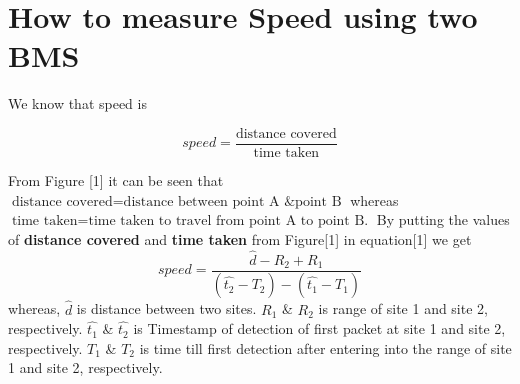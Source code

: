 \documentclass[10pt,twocolumn,letterpaper]{article}
\begin{document}


\section{How to measure Speed using two BMS}
We know that speed is

\begin{equation}
   speed = \frac{\text{distance covered}}{\text{time taken}}
\end{equation}

From Figure [1] it can be seen that \(\text{distance covered} = \text{distance between point A \& point B}\) whereas \(\text{time taken} = \text{time taken to travel from point A to point B.}\) By putting the values of \textbf{distance covered} and \textbf{time taken} from Figure[1] in equation[1] we get
\begin{equation}
   speed = \frac{ \hat{d} - R_2 + R_1 }{ (\hat{t_2} - T_2 ) - (\hat{t_1} - T_1 ) }  
\end{equation}
whereas,  $\hat{d}$ is distance between two sites. $R_1$ \& $R_2$ is range of site 1 and site 2, respectively. $\hat{t_1}$ \& $\hat{t_2}$ is Timestamp of detection of first packet at site 1 and site 2, respectively. $T_1$ \& $T_2$ is time till first detection after entering into the range of site 1 and site 2, respectively. 
\end{document}
